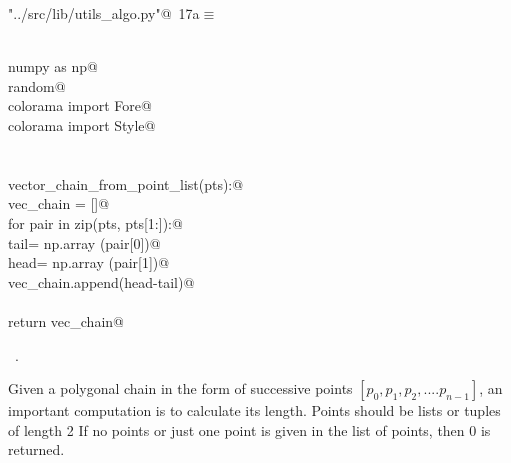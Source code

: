 \documentclass[11.5pt]{report}
\begin{document}
\begin{flushleft} \small\label{scrap11}\raggedright\small
{} \verb@"../src/lib/utils_algo.py"@\nobreak\ {\footnotesize {17a}}$\equiv$
\vspace{-1ex}
\begin{list}{}{} \item
\mbox{}\verb@@\\
\mbox{}\verb@import numpy as np@\\
\mbox{}\verb@import random@\\
\mbox{}\verb@from colorama import Fore@\\
\mbox{}\verb@from colorama import Style@\\
\mbox{}\verb@@\\
\mbox{}\verb@@\\
\mbox{}\verb@def vector_chain_from_point_list(pts):@\\
\mbox{}\verb@    vec_chain = []@\\
\mbox{}\verb@    for pair in zip(pts, pts[1:]):@\\
\mbox{}\verb@        tail= np.array (pair[0])@\\
\mbox{}\verb@        head= np.array (pair[1])@\\
\mbox{}\verb@        vec_chain.append(head-tail)@\\
\mbox{}\verb@@\\
\mbox{}\verb@    return vec_chain@\\
\mbox{}\verb@@{\NWsep}
\end{list}
\vspace{-1.5ex}
\footnotesize
\begin{list}{}{\setlength{\itemsep}{-\parsep}\setlength{\itemindent}{-\leftmargin}}
\item \NWtxtFileDefBy\ .

\item{}
\end{list}
\vspace{4ex}
\end{flushleft}

\newchunk Given a polygonal chain in the form of successive points  $[p_0,p_1,p_2,....p_{n-1}]$, 
an important computation is to calculate its length. Points should be lists or tuples of length 2
If no points or just one point is given in the list of points, then 0 is returned.
\end{document}
